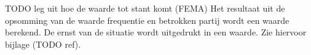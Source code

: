 
TODO leg uit hoe de waarde tot stant komt (FEMA)
Het resultaat uit de opsomming van de waarde frequentie en betrokken partij wordt een waarde berekend. 
De ernst van de situatie wordt uitgedrukt in een waarde. Zie hiervoor bijlage (TODO ref).


